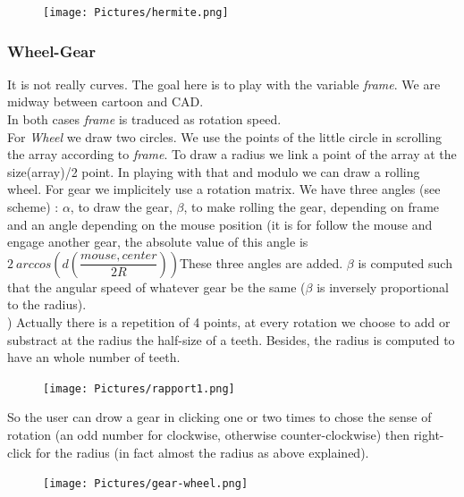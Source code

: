\documentclass{article}
\begin{document}
\begin{figure}[H]
   \texttt{[image: Pictures/hermite.png]}
\end{figure}
\subsubsection*{Wheel-Gear}
It is not really curves. The goal here is to play with the variable \textit{frame}. We are midway between cartoon and CAD.\\
In both cases \textit{frame} is traduced as rotation speed. \\
For \textit{Wheel} we draw two circles. We use the points of the little circle in scrolling the array according to \textit{frame}. To draw a radius we link a point of the array at the size(array)/2 point. In playing with that and modulo we can draw a rolling wheel.
For gear we implicitely use a rotation matrix. We have three angles (see scheme) : $\alpha$, to draw the gear, $\beta$, to make rolling the gear, depending on frame and an angle depending on the mouse position (it is for follow the mouse and engage another gear, the absolute value of this angle is $2\ arccos(d(\dfrac{mouse,center}{2 R}))$These three angles are added. $\beta$ is computed such that the angular speed of whatever gear be the same ($\beta$ is inversely proportional to the radius).\\ )
Actually there is a repetition of 4 points, at every rotation we choose to add or substract at the radius the half-size of a teeth. Besides, the radius is computed to have an whole number of teeth.\\
\begin{figure}[H]
   \texttt{[image: Pictures/rapport1.png]}
\end{figure}
So the user can drow a gear in clicking one or two times to chose the sense of rotation (an odd number for clockwise, otherwise counter-clockwise) then right-click for the radius (in fact almost the radius as above explained).
\begin{figure}[H]
   \texttt{[image: Pictures/gear-wheel.png]}
\end{figure}
\end{document}
